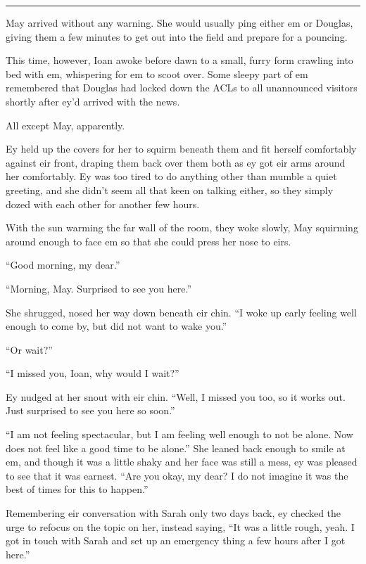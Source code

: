 \begin{center}\rule{0.5\linewidth}{0.5pt}\end{center}

May arrived without any warning. She would usually ping either em or Douglas, giving them a few minutes to get out into the field and prepare for a pouncing.

This time, however, Ioan awoke before dawn to a small, furry form crawling into bed with em, whispering for em to scoot over. Some sleepy part of em remembered that Douglas had locked down the ACLs to all unannounced visitors shortly after ey'd arrived with the news.

All except May, apparently.

Ey held up the covers for her to squirm beneath them and fit herself comfortably against eir front, draping them back over them both as ey got eir arms around her comfortably. Ey was too tired to do anything other than mumble a quiet greeting, and she didn't seem all that keen on talking either, so they simply dozed with each other for another few hours.

With the sun warming the far wall of the room, they woke slowly, May squirming around enough to face em so that she could press her nose to eirs.

``Good morning, my dear.''

``Morning, May. Surprised to see you here.''

She shrugged, nosed her way down beneath eir chin. ``I woke up early feeling well enough to come by, but did not want to wake you.''

``Or wait?''

``I missed you, Ioan, why would I wait?''

Ey nudged at her snout with eir chin. ``Well, I missed you too, so it works out. Just surprised to see you here so soon.''

``I am not feeling spectacular, but I am feeling well enough to not be alone. Now does not feel like a good time to be alone.'' She leaned back enough to smile at em, and though it was a little shaky and her face was still a mess, ey was pleased to see that it was earnest. ``Are you okay, my dear? I do not imagine it was the best of times for this to happen.''

Remembering eir conversation with Sarah only two days back, ey checked the urge to refocus on the topic on her, instead saying, ``It was a little rough, yeah. I got in touch with Sarah and set up an emergency thing a few hours after I got here.''

